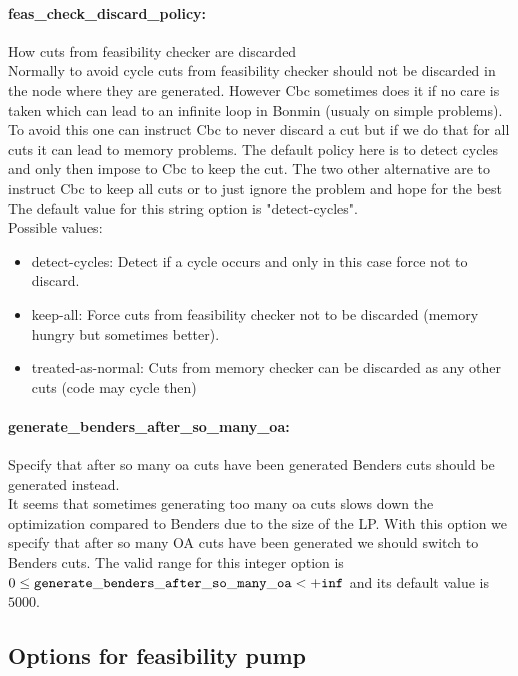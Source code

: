 \paragraph{feas\_check\_discard\_policy:}\label{sec:feas_check_discard_policy} How cuts from feasibility checker are discarded $\;$ \\
 Normally to avoid cycle cuts from feasibility
checker should not be discarded in the node where
they are generated. However Cbc sometimes does it
if no care is taken which can lead to an infinite
loop in Bonmin (usualy on simple problems). To
avoid this one can instruct Cbc to never discard
a cut but if we do that for all cuts it can lead
to memory problems. The default policy here is to
detect cycles and only then impose to Cbc to keep
the cut. The two other alternative are to
instruct Cbc to keep all cuts or to just ignore
the problem and hope for the best
The default value for this string option is "detect-cycles".
\\ 
Possible values:
\begin{itemize}
   \item detect-cycles: Detect if a cycle occurs and only in this case
force not to discard.
   \item keep-all: Force cuts from feasibility checker not to be
discarded (memory hungry but sometimes better).
   \item treated-as-normal: Cuts from memory checker can be discarded as
any other cuts (code may cycle then)
\end{itemize}

\paragraph{generate\_benders\_after\_so\_many\_oa:}\label{sec:generate_benders_after_so_many_oa} Specify that after so many oa cuts have been generated Benders cuts should be generated instead. $\;$ \\
 It seems that sometimes generating too many oa
cuts slows down the optimization compared to
Benders due to the size of the LP. With this
option we specify that after so many OA cuts have
been generated we should switch to Benders cuts. The valid range for this integer option is
$0 \le {\tt generate\_benders\_after\_so\_many\_oa } <  {\tt +inf}$
and its default value is $5000$.


\subsection{Options for feasibility pump}
\label{sec:Options_for_feasibility_pump}
